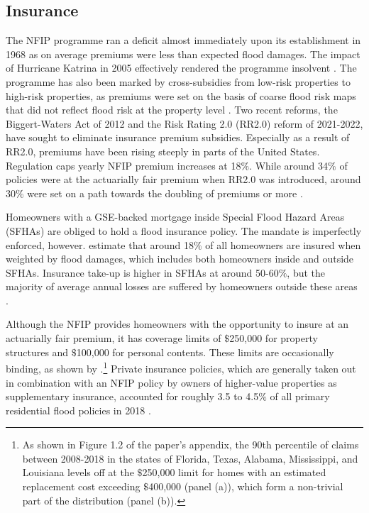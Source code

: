 \documentclass[12pt]{article}
\begin{document}
\subsection{Insurance}
The NFIP programme ran a deficit almost immediately upon its establishment in 1968 as on average premiums were less than expected flood damages. The impact of Hurricane Katrina in 2005 effectively rendered the programme insolvent \citep{michel2010catastrophe}. The programme has also been marked by cross-subsidies from low-risk properties to high-risk properties, as premiums were set on the basis of coarse flood risk maps that did not reflect flood risk at the property level \citep{kousky2018financing}. Two recent reforms, the Biggert-Waters Act of 2012 and the Risk Rating 2.0 (RR2.0) reform of 2021-2022, have sought to eliminate insurance premium subsidies. Especially as a result of RR2.0, premiums have been rising steeply in parts of the United States. Regulation  caps yearly NFIP premium increases at 18$\%$. While around 34$\%$ of policies were at the actuarially fair premium when RR2.0 was introduced, around 30$\%$ were set on a path towards the doubling of premiums or more \citep[p.~25]{gao2023flood}.  

Homeowners with a GSE-backed mortgage inside Special Flood Hazard Areas (SFHAs) are obliged to hold a flood insurance policy. The mandate is imperfectly enforced, however. \cite{gruber2026optimal} estimate that around 18$\%$ of all homeowners are insured when weighted by flood damages, which includes both homeowners inside and outside SFHAs. Insurance take-up is higher in SFHAs at around 50-60$\%$, but the majority of average annual losses are suffered by homeowners outside these areas \citep{amornsiripanitch2025measuring}.

Although the NFIP provides homeowners with the opportunity to insure at an actuarially fair premium, it has coverage limits of $\$$250,000 for property structures and $\$$100,000 for personal contents. These limits are occasionally binding, as shown by \cite{sastry2026bears}.\footnote{As shown in Figure 1.2 of the paper's appendix, the 90th percentile of claims between 2008-2018 in the states of Florida, Texas, Alabama, Mississippi, and Louisiana  levels off at the $\$$250,000 limit for homes with an estimated replacement cost exceeding $\$$400,000 (panel (a)), which form a non-trivial part of the distribution (panel (b)).} Private insurance policies, which are generally taken out in combination with an NFIP policy by owners of higher-value properties as supplementary insurance, accounted for roughly 3.5 to 4.5$\%$ of all primary residential flood policies in 2018 \citep{kousky2018emerging}.
\end{document}

